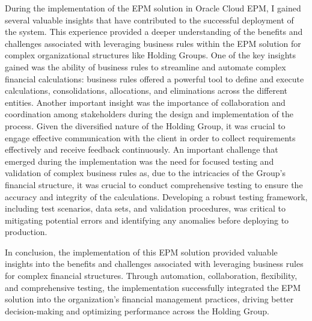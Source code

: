 \documentclass[12pt,a4paper,openright,twoside]{book}
\begin{document}
During the implementation of the EPM solution in Oracle Cloud EPM, I gained several valuable insights that have contributed to the successful deployment of the system.
%
This experience provided a deeper understanding of the benefits and challenges associated with leveraging business rules within the EPM solution for complex organizational structures like Holding Groups.
%
One of the key insights gained was the ability of business rules to streamline and automate complex financial calculations: business rules offered a powerful tool to define and execute calculations, consolidations, allocations, and eliminations across the different entities. 
%
Another important insight was the importance of collaboration and coordination among stakeholders during the design and implementation of the process. 
%
Given the diversified nature of the Holding Group, it was crucial to engage effective communication with the client in order to collect requirements effectively and receive feedback continuously.
%
An important challenge that emerged during the implementation was the need for focused testing and validation of complex business rules as, due to the intricacies of the Group's financial structure, it was crucial to conduct comprehensive testing to ensure the accuracy and integrity of the calculations. 
%
Developing a robust testing framework, including test scenarios, data sets, and validation procedures, was critical to mitigating potential errors and identifying any anomalies before deploying to production.

In conclusion, the implementation of this EPM solution provided valuable insights into the benefits and challenges associated with leveraging business rules for complex financial structures. 
%
Through automation, collaboration, flexibility, and comprehensive testing, the implementation successfully integrated the EPM solution into the organization's financial management practices, driving better decision-making and optimizing performance across the Holding Group.


\nocite{*} %


\end{document}
